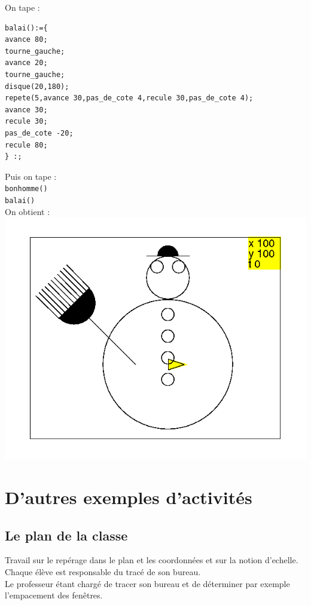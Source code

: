 \documentclass[a4paper,11pt]{book}
\begin{document}
%

On tape :
\begin{verbatim}
balai():={
avance 80;
tourne_gauche;
avance 20;
tourne_gauche;
disque(20,180);
repete(5,avance 30,pas_de_cote 4,recule 30,pas_de_cote 4);
avance 30;
recule 30;
pas_de_cote -20;
recule 80;
} :;
\end{verbatim}
Puis on tape :\\
{\tt bonhomme()}\\
{\tt balai()}\\
On obtient :\\
%
\includegraphics[width=\textwidth]{tortbbn}
\chapter{D'autres exemples d'activit\'es}
\section{Le plan de la classe}
Travail sur le rep\'erage dans le plan et les coordonn\'ees et sur la notion 
d'echelle.\\
Chaque \'el\`eve est responsable du trac\'e de son bureau.\\
Le professeur \'etant charg\'e de tracer son bureau et de d\'eterminer 
par exemple l'empacement des fen\^etres.
\end{document}
